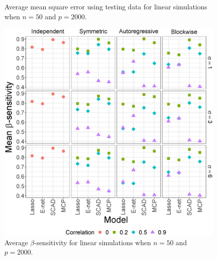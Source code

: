 \documentclass{article}
\begin{document}
\begin{figure}[t!]
\begin{minipage}[t]{0.47\textwidth}
			\captionsetup{width = 0.95\textwidth}
			\caption{Average mean square error using testing data for linear simulations when $n = 50$ and $p = 	2000$.}
			\label{fig:linear-test-mse}
		\end{minipage}
		\vspace{6pt}
		
		\begin{minipage}[t]{0.47\textwidth}
			\includegraphics[width = \textwidth]{images/facet/publication_facet_sensitivity_1_50_2000.eps}
			\captionsetup{width = 0.95\textwidth}
			\caption{Average $\beta$-sensitivity for linear simulations when $n = 50$ and $p = 	2000$.}
			\label{fig:linear-sensitivity}
		\end{minipage}
		\hspace{6pt}
		\begin{minipage}[t]{0.47\textwidth}

\end{minipage}
\end{figure}
\end{document}
